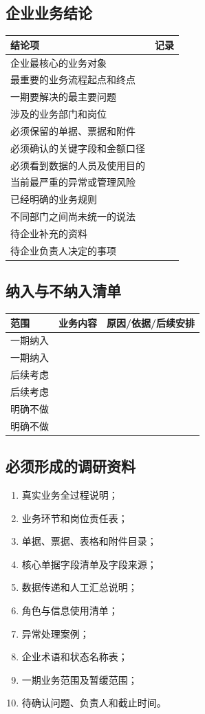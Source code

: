 \documentclass[UTF8,a4paper,11pt]{ctexart}
\begin{document}
\subsection{企业业务结论}
\begin{longtable}{p{}p{}}
\toprule
结论项 & 记录 \\
\midrule
企业最核心的业务对象 & \\
最重要的业务流程起点和终点 & \\
一期要解决的最主要问题 & \\
涉及的业务部门和岗位 & \\
必须保留的单据、票据和附件 & \\
必须确认的关键字段和金额口径 & \\
必须看到数据的人员及使用目的 & \\
当前最严重的异常或管理风险 & \\
已经明确的业务规则 & \\
不同部门之间尚未统一的说法 & \\
待企业补充的资料 & \\
待企业负责人决定的事项 & \\
\bottomrule
\end{longtable}

\subsection{纳入与不纳入清单}
\begin{longtable}{p{}p{}p{}}
\toprule
范围 & 业务内容 & 原因/依据/后续安排 \\
\midrule
一期纳入 & & \\
一期纳入 & & \\
后续考虑 & & \\
后续考虑 & & \\
明确不做 & & \\
明确不做 & & \\
\bottomrule
\end{longtable}

\subsection{必须形成的调研资料}
\begin{enumerate}
  \item 真实业务全过程说明；
  \item 业务环节和岗位责任表；
  \item 单据、票据、表格和附件目录；
  \item 核心单据字段清单及字段来源；
  \item 数据传递和人工汇总说明；
  \item 角色与信息使用清单；
  \item 异常处理案例；
  \item 企业术语和状态名称表；
  \item 一期业务范围及暂缓范围；
  \item 待确认问题、负责人和截止时间。
\end{enumerate}
\end{document}
